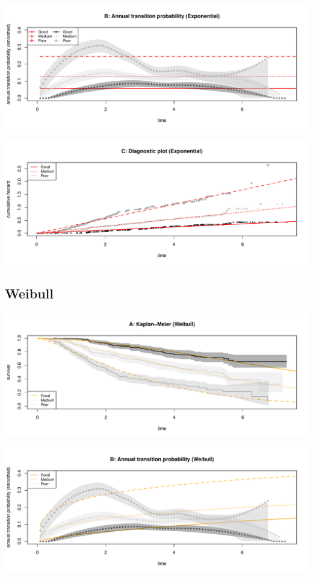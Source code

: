 \documentclass[]{article}
\begin{document}
\begin{flushleft}\includegraphics[height=0.25\textheight]{Images/expo-2} \end{flushleft}

\begin{flushleft}\includegraphics[height=0.25\textheight]{Images/expo-3} \end{flushleft}

\newpage  

\subsection{Weibull}\label{weibull}

\begin{flushleft}\includegraphics[height=0.25\textheight]{Images/weib-1} \end{flushleft}

\begin{flushleft}\includegraphics[height=0.25\textheight]{Images/weib-2} \end{flushleft}
\end{document}
